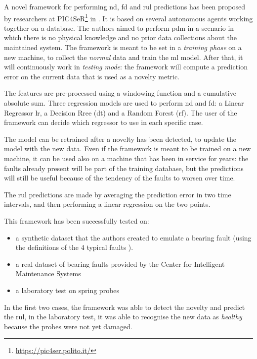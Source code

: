 A novel framework for performing \gls{nd}, \gls{fd} and \gls{rul} predictions has been proposed by researchers at PIC4SeR\footnote{\url{https://pic4ser.polito.it/}} in \cite{Umberto}. It is based on several autonomous agents working together on a database.  The authors aimed to perform \gls{pdm} in a scenario in which there is no physical knowledge and no prior data collections about the maintained system. The framework is meant to be set in a \emph{training phase} on a new machine, to collect the \emph{normal} data and train the \gls{ml} model. After that, it will continuously work in \emph{testing mode}: the framework will compute a prediction error on the current data that is used as a novelty metric.

The features are pre-processed using a windowing function and a cumulative absolute sum. Three regression models are used to perform \gls{nd} and \gls{fd}: a Linear Regressor \gls{lr}, a Decision Rree (\gls{dt}) and a Random Forest (\gls{rf}). The user of the framework can decide which regressor to use in each specific case. 

The model can be retrained after a novelty has been detected, to update the model with the new data. Even if the framework is meant to be trained on a new machine, it can be used also on a machine that has been in service for years: the faults already present will be part of the training database, but the predictions will still be useful because of the tendency of the faults to worsen over time.

The \gls{rul} predictions are made by averaging the prediction error in two time intervals, and then performing a linear regression on the two points. 

This framework has been successfully tested on:  
\begin{itemize}
    \item a synthetic dataset that the authors created to emulate a bearing fault (using the definitions of the 4 typical faults \cite{RollingSignature}).
    \item a real dataset of bearing faults provided by the Center for Intelligent Maintenance Systems \cite{IMSpaper}
    \item a laboratory test on spring probes
\end{itemize}

In the first two cases, the framework was able to detect the novelty and predict the \gls{rul}, in the laboratory test, it was able to recognise the new data as \emph{healthy} because the probes were not yet damaged.


